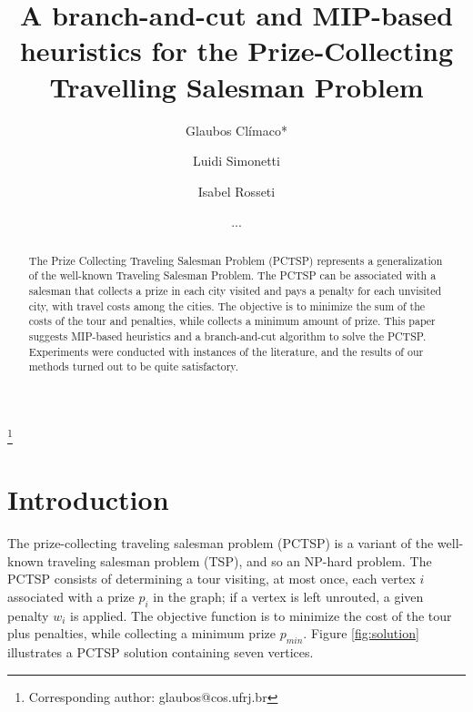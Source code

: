 \documentclass{ro}
\begin{document}
\title{A branch-and-cut and MIP-based heuristics for the Prize-Collecting Travelling Salesman Problem}%
%
\author{Glaubos Cl\'imaco*}\address{Universidade Federal do Rio de Janeiro, PESC-COPPE, Cidade Universit\'aria, Centro de Tecnologia, Bloco H, 21941-972, Rio de Janeiro, Brasil.}\thanks{Corresponding author: glaubos@cos.ufrj.br}
\author{Luidi Simonetti}\address{Universidade Federal do Rio de Janeiro, PESC-COPPE, Cidade Universit\'aria, Centro de Tecnologia, Bloco H, 21941-972, Rio de Janeiro, Brasil.}
\author{Isabel Rosseti}\address{ Universidade Federal Fluminense, Instituto de Computa\c{c}\~ao. Rua Passo da P\'atria 156 S\~ao Domingos 24210-240 - Niter\'oi, RJ - Brasil}
%
\date{...}
%
\begin{abstract} 

The Prize Collecting Traveling Salesman Problem
(PCTSP) represents a generalization of the well-known Traveling Salesman Problem. The PCTSP can be associated with a salesman that collects a prize in each city visited and pays a penalty for each unvisited city, with travel costs among the cities. The
objective is to minimize the sum of the costs of the tour
and penalties, while collects a minimum amount of prize.
This paper suggests MIP-based heuristics and a branch-and-cut algorithm to solve the PCTSP. Experiments were conducted with instances of the literature, and the results of our methods turned out to be quite satisfactory.

 \end{abstract}
%


%
%
\maketitle
\section{Introduction}

The prize-collecting traveling salesman problem (PCTSP) is a variant of the well-known traveling salesman problem (TSP), and so an NP-hard problem. The PCTSP consists of determining a tour visiting, at most once, each vertex $i$ associated with a prize $p_i$ in the graph; if a vertex is left unrouted, a given penalty $w_i$ is applied. 
The objective function is to minimize the cost of the tour plus penalties, while collecting a minimum prize $p_{min}$. Figure \ref{fig:solution} illustrates a PCTSP solution containing seven vertices.
\end{document}
